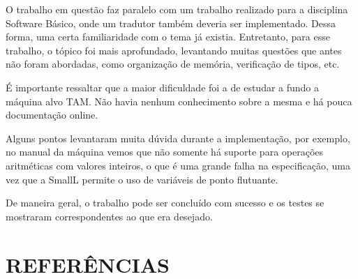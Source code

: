 \documentclass[12pt]{article}
\begin{document}
O trabalho em questão faz paralelo com um trabalho realizado para a disciplina Software Básico, onde um tradutor
também deveria ser implementado. Dessa forma, uma certa familiaridade com o tema já existia. Entretanto, para esse
trabalho, o tópico foi mais aprofundado, levantando muitas questões que antes não foram abordadas, como organização
de memória, verificação de tipos, etc.

É importante ressaltar que a maior dificuldade foi a de estudar a fundo a máquina alvo TAM. Não havia nenhum conhecimento
sobre a mesma e há pouca documentação online.

Alguns pontos levantaram muita dúvida durante a implementação, por exemplo, no manual da máquina vemos que não somente 
há suporte para operações aritméticas com valores inteiros, o que é uma grande falha na especificação, uma vez que a SmallL
permite o uso de variáveis de ponto flutuante. 

De maneira geral, o trabalho pode ser concluído com sucesso e os testes se mostraram correspondentes ao que era desejado.

\section{REFERÊNCIAS}



\end{document}
